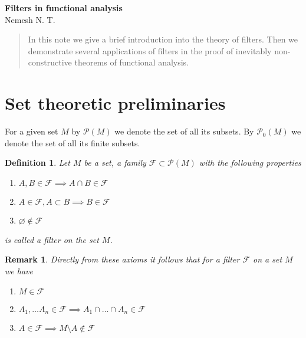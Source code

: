 \documentclass[12pt]{article}
\newtheorem{remark}[theorem]{Remark}
\newtheorem{definition}[theorem]{Definition}
\begin{document}
\begin{center}

    \Large \textbf{Filters in functional analysis}\\[0.5cm]
    \small {Nemesh N. T.}\\[0.5cm]

\end{center}

\begin{abstract}
    In this note we give a brief introduction into the theory of filters. Then
    we demonstrate several applications of filters in the proof of inevitably
    non-constructive theorems of functional analysis.
\end{abstract}

\section{Set theoretic preliminaries}

For a given set $M$ by $\mathcal{P}(M)$ we denote the set of all its subsets. By
$\mathcal{P}_0(M)$ we denote the set of all its finite subsets.

\begin{definition}\label{DefFilter} Let $M$ be a set, a family
    $\mathcal{F}\subset\mathcal{P}(M)$ with the following properties
    \begin{enumerate}[label = (\roman*)]
        \item $A,B\in\mathcal{F}\implies A\cap B\in\mathcal{F}$
        \item $A\in\mathcal{F}, A\subset B\implies B\in\mathcal{F}$
        \item $\varnothing\notin\mathcal{F}$
    \end{enumerate}
    is called a filter on the set $M$.
\end{definition}

\begin{remark}\label{RemAnyFilterContainsItsSet} Directly from these axioms it
    follows that for a filter $\mathcal{F}$ on a set $M$ we have
    \begin{enumerate}[label = (\roman*)]
        \item $M\in\mathcal{F}$
        \item $A_1,\ldots A_n\in\mathcal{F}\implies A_1\cap\ldots\cap
                  A_n\in\mathcal{F}$

        \item $A\in\mathcal{F}\implies M\setminus A\notin\mathcal{F}$
    \end{enumerate}
\end{remark}
\end{document}
